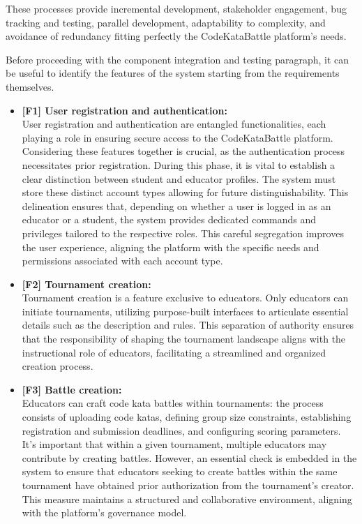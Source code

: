 These processes provide incremental development, stakeholder engagement, bug tracking and testing, parallel development, adaptability to complexity, and avoidance of redundancy fitting perfectly the CodeKataBattle platform's needs.

Before proceeding with the component integration and testing paragraph, it can be useful to identify the features of the system starting from the requirements themselves.
\begin{itemize}
    \item \textbf{[F1] User registration and authentication:} \\
    User registration and authentication are entangled functionalities, each playing a role in ensuring secure access to the CodeKataBattle platform. Considering these features together is crucial, as the authentication process necessitates prior registration.
    During this phase, it is vital to establish a clear distinction between student and educator profiles. The system must store these distinct account types allowing for future distinguishability. This delineation ensures that, depending on whether a user is logged in as an educator or a student, the system provides dedicated commands and privileges tailored to the respective roles. This careful segregation improves the user experience, aligning the platform with the specific needs and permissions associated with each account type.
    
    \item \textbf{[F2] Tournament creation:} \\
    Tournament creation is a feature exclusive to educators. Only educators can initiate tournaments, utilizing purpose-built interfaces to articulate essential details such as the description and rules. This separation of authority ensures that the responsibility of shaping the tournament landscape aligns with the instructional role of educators, facilitating a streamlined and organized creation process.
    
    \item \textbf{[F3] Battle creation:} \\
    Educators can craft code kata battles within tournaments: the process consists of uploading code katas, defining group size constraints, establishing registration and submission deadlines, and configuring scoring parameters. It's important that within a given tournament, multiple educators may contribute by creating battles. However, an essential check is embedded in the system to ensure that educators seeking to create battles within the same tournament have obtained prior authorization from the tournament's creator. This measure maintains a structured and collaborative environment, aligning with the platform's governance model.
    

\end{itemize}
